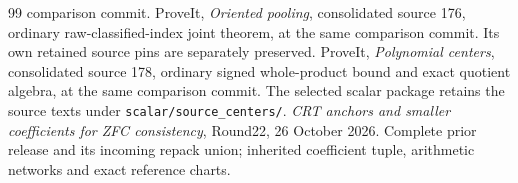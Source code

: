 \begin{thebibliography}{99}
comparison commit.
 ProveIt, \emph{Oriented pooling}, consolidated source
176, ordinary raw-classified-index joint theorem, at the same comparison
commit. Its own retained source pins are separately preserved.
 ProveIt, \emph{Polynomial centers}, consolidated
source 178, ordinary signed whole-product bound and exact quotient algebra,
at the same comparison commit. The selected scalar package retains the
source texts under \nolinkurl{scalar/source_centers/}.
 \emph{CRT anchors and smaller coefficients for ZFC
consistency}, Round22, 26 October 2026. Complete prior release and its
incoming repack union; inherited coefficient tuple, arithmetic networks
and exact reference charts.
\end{thebibliography}
\endgroup
